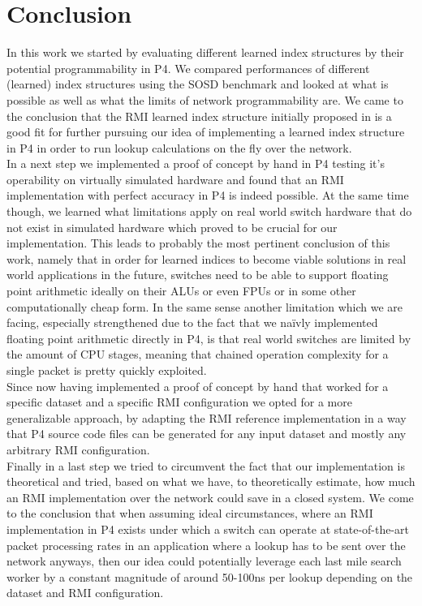 
\chapter{Conclusion}
\label{ch:conclusion}
In this work we started by evaluating different learned index structures by their potential programmability in P4. We compared performances of different (learned) index structures using the SOSD benchmark \cite{sosd-neurips} and looked at what is possible as well as what the limits of network programmability are. We came to the conclusion that the RMI learned index structure initially proposed in \cite{rmi} is a good fit for further pursuing our idea of implementing a learned index structure in P4 in order to run lookup calculations on the fly over the network.\\

In a next step we implemented a proof of concept by hand in P4 testing it's operability on virtually simulated hardware and found that an RMI implementation with perfect accuracy in P4 is indeed possible. At the same time though, we learned what limitations apply on real world switch hardware that do not exist in simulated hardware which proved to be crucial for our implementation. This leads to probably the most pertinent conclusion of this work, namely that in order for learned indices to become viable solutions in real world applications in the future, switches need to be able to support floating point arithmetic ideally on their ALUs or even FPUs or in some other computationally cheap form. In the same sense another limitation which we are facing, especially strengthened due to the fact that we naïvly implemented floating point arithmetic directly in P4, is that real world switches are limited by the amount of CPU stages, meaning that chained operation complexity for a single packet is pretty quickly exploited.\\

Since now having implemented a proof of concept by hand that worked for a specific dataset and a specific RMI configuration we opted for a more generalizable approach, by adapting the RMI reference implementation \cite{cdfshop} in a way that P4 source code files can be generated for any input dataset and mostly any arbitrary RMI configuration.\\

Finally in a last step we tried to circumvent the fact that our implementation is theoretical and tried, based on what we have, to theoretically estimate, how much an RMI implementation over the network could save in a closed system. We come to the conclusion that when assuming ideal circumstances, where an RMI implementation in P4 exists under which a switch can operate at state-of-the-art packet processing rates in an application where a lookup has to be sent over the network anyways, then our idea could potentially leverage each last mile search worker by a constant magnitude of around 50-100ns per lookup depending on the dataset and RMI configuration.

